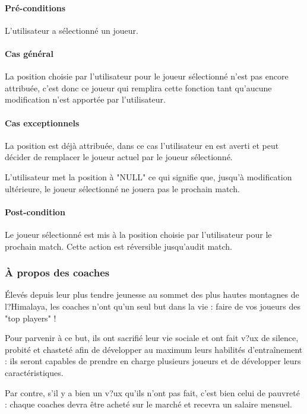 \paragraph{Pré-conditions}
L'utilisateur a sélectionné un joueur.
\paragraph{Cas général}
La position choisie par l'utilisateur pour le joueur sélectionné n'est pas encore attribuée, c'est donc ce joueur qui remplira cette fonction tant qu'aucune modification n'est apportée par l'utilisateur.
\paragraph{Cas exceptionnels}
\begin{list}{}{\leftmargin=1.5em}
\item{La position est déjà attribuée, dans ce cas l'utilisateur en est averti et peut décider de remplacer le joueur actuel par le joueur sélectionné.}
\item{L'utilisateur met la position à "NULL" ce qui signifie que, jusqu'à modification ultérieure, le joueur sélectionné ne jouera pas le prochain match.}
\end{list}
\paragraph{Post-condition}
Le joueur sélectionné est mis à la position choisie par l'utilisateur pour le prochain match. Cette action est réversible jusqu'audit match.

\subsubsection{À propos des coaches}
Élevés depuis leur plus tendre jeunesse au sommet des plus hautes montagnes de l?Himalaya, les coaches n'ont qu'un seul but dans la vie : faire de vos joueurs des "top players" !

Pour parvenir à ce but, ils ont sacrifié leur vie sociale et ont fait v?ux de silence, probité et chasteté afin de développer au maximum leurs habilités d'entraînement : ils seront capables de prendre en charge plusieurs joueurs et de développer leurs caractéristiques.

Par contre, s'il y a bien un v?ux qu'ils n'ont pas fait, c'est bien celui de pauvreté : chaque coaches devra être acheté sur le marché et recevra un salaire mensuel.


